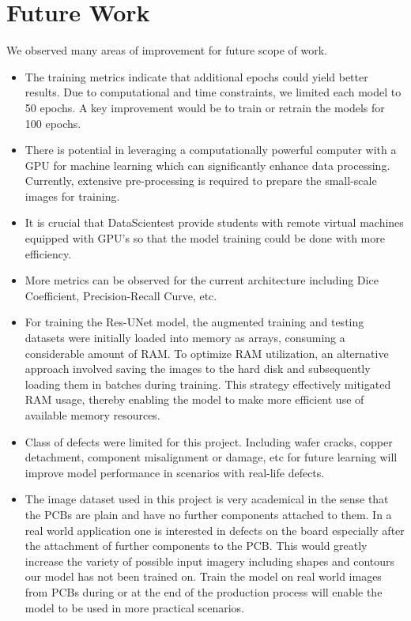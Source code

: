 \documentclass[12pt]{article}
\begin{document}
\clearpage
\newpage

\section{Future Work}
We observed many areas of improvement for future scope of work. 
\begin{itemize}
    \item The training metrics indicate that additional epochs could yield better results. Due to computational and time constraints, we limited each model to 50 epochs. A key improvement would be to train or retrain the models for 100 epochs.
    \item There is potential in leveraging a computationally powerful computer with a GPU for machine learning which can significantly enhance data processing. Currently, extensive pre-processing is required to prepare the small-scale images for training.
    \item It is crucial that DataScientest provide students with remote virtual machines equipped with GPU's so that the model training could be done with more efficiency.
    \item More metrics can be observed for the current architecture including Dice Coefficient, Precision-Recall Curve, etc.  
    \item For training the Res-UNet model, the augmented training and testing datasets were initially loaded into memory as arrays, consuming a considerable amount of RAM. To optimize RAM utilization, an alternative approach involved saving the images to the hard disk and subsequently loading them in batches during training. This strategy effectively mitigated RAM usage, thereby enabling the model to make more efficient use of available memory resources.
    \item Class of defects were limited for this project. Including wafer cracks, copper detachment, component misalignment or damage, etc for future learning will improve model performance in scenarios with real-life defects.
    \item The image dataset used in this project is very academical in the sense that the PCBs are plain and have no further components attached to them. In a real world application one is interested in defects on the board especially after the attachment of further components to the PCB. This would greatly increase the variety of possible input imagery including shapes and contours our model has not been trained on. Train the model on real world images from PCBs during or at the end of the production process will enable the model to be used in more practical scenarios.
\end{itemize}
\clearpage
\newpage
\end{document}
